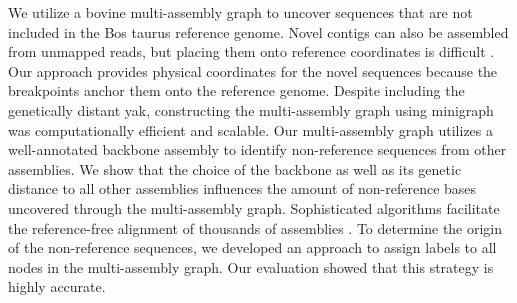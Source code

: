 \documentclass[../main.tex]{subfiles}
\begin{document}
We utilize a bovine multi-assembly graph to uncover sequences that are not included in the Bos taurus reference genome. Novel contigs can also be assembled from unmapped reads, but placing them onto reference coordinates is difficult \citep{sherman2019assembly,golicz2016pangenome}. Our approach provides physical coordinates for the novel sequences because the breakpoints anchor them onto the reference genome. Despite including the genetically distant yak, constructing the multi-assembly graph using minigraph \citep{li2020design} was computationally efficient and scalable. Our multi-assembly graph utilizes a well-annotated backbone assembly to identify non-reference sequences from other assemblies. We show that the choice of the backbone as well as its genetic distance to all other assemblies influences the amount of non-reference bases uncovered through the multi-assembly graph. Sophisticated algorithms facilitate the reference-free alignment of thousands of assemblies \citep{armstrong2020progressive}. To determine the origin of the non-reference sequences, we developed an approach to assign labels to all nodes in the multi-assembly graph. Our evaluation showed that this strategy is highly accurate.
\end{document}
